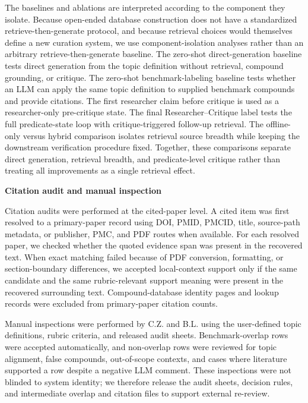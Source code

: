 \documentclass[
]{article}
\begin{document}
The baselines and ablations are interpreted according to the component
they isolate. Because open-ended database construction does not have a
standardized retrieve-then-generate protocol, and because retrieval
choices would themselves define a new curation system, we use
component-isolation analyses rather than an arbitrary
retrieve-then-generate baseline. The zero-shot direct-generation
baseline tests direct generation from the
topic definition without retrieval, compound grounding, or critique. The
zero-shot benchmark-labeling baseline tests whether an LLM can apply the
same topic definition to supplied benchmark compounds and provide
citations. The first researcher claim before critique is used as a
researcher-only pre-critique state. The final Researcher--Critique label
tests the full predicate-state loop with critique-triggered follow-up
retrieval. The offline-only versus hybrid comparison isolates retrieval
source breadth while keeping the downstream verification procedure
fixed. Together, these comparisons separate direct generation,
retrieval breadth, and predicate-level critique rather than treating all
improvements as a single retrieval effect.

\textbf{Citation audit and manual inspection}

Citation audits were performed at the cited-paper level. A cited item
was first resolved to a primary-paper record using DOI, PMID, PMCID,
title, source-path metadata, or publisher, PMC, and PDF routes when
available. For each resolved paper, we checked whether the quoted
evidence span was present in the recovered text. When exact matching
failed because of PDF conversion, formatting, or section-boundary
differences, we accepted local-context support only if the same
candidate and the same rubric-relevant support meaning were present in
the recovered surrounding text. Compound-database identity pages and
lookup records were excluded from primary-paper citation counts.

Manual inspections were performed by C.Z. and B.L. using the user-defined
topic definitions, rubric criteria, and released audit sheets. Benchmark-overlap rows were
accepted automatically, and non-overlap rows were reviewed for topic
alignment, false compounds, out-of-scope contexts, and cases where
literature supported a row despite a negative LLM comment. These
inspections were not blinded to system identity; we therefore release
the audit sheets, decision rules, and intermediate overlap and citation
files to support external re-review.
\end{document}
